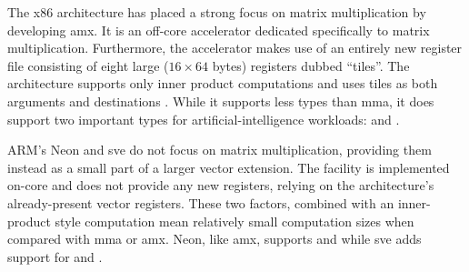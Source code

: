 \documentclass[\main/thesis.tex]{subfiles}
\begin{document}
The x86 architecture has placed a strong focus on matrix multiplication by developing \gls{amx}.
It is an off-core accelerator dedicated specifically to matrix multiplication.
Furthermore, the accelerator makes use of an entirely new register file consisting of eight large ($16 \times 64$ bytes) registers dubbed ``tiles''.
The architecture supports only inner product computations and uses tiles as both arguments and destinations .
While it supports less types than \gls{mma}, it does support two important types for artificial-intelligence workloads:  and .

ARM's Neon and \gls{sve} do not focus on matrix multiplication, providing them instead as a small part of a larger vector extension.
The facility is implemented on-core and does not provide any new registers, relying on the architecture's already-present vector registers.
These two factors, combined with an inner-product style computation mean relatively small computation sizes when compared with \gls{mma} or \gls{amx}.
Neon, like \gls{amx}, supports  and  while \gls{sve} adds support for  and .
\end{document}
